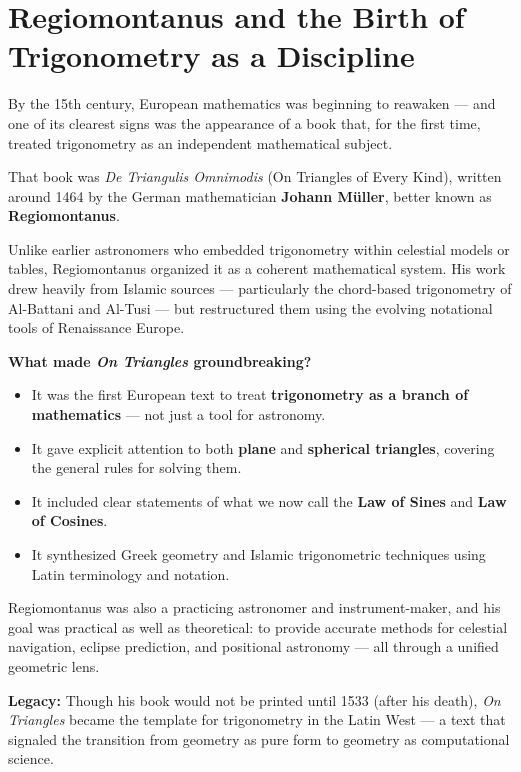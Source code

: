 \section{Regiomontanus and the Birth of Trigonometry as a Discipline}

By the 15th century, European mathematics was beginning to reawaken — and one of its clearest signs was the appearance of a book that, for the first time, treated trigonometry as an independent mathematical subject.

That book was \textit{De Triangulis Omnimodis} (On Triangles of Every Kind), written around 1464 by the German mathematician \textbf{Johann Müller}, better known as \textbf{Regiomontanus}.

\medskip

Unlike earlier astronomers who embedded trigonometry within celestial models or tables, Regiomontanus organized it as a coherent mathematical system. His work drew heavily from Islamic sources — particularly the chord-based trigonometry of Al-Battani and Al-Tusi — but restructured them using the evolving notational tools of Renaissance Europe.

\medskip

\textbf{What made \textit{On Triangles} groundbreaking?}
\begin{itemize}
  \item It was the first European text to treat \textbf{trigonometry as a branch of mathematics} — not just a tool for astronomy.
  \item It gave explicit attention to both \textbf{plane} and \textbf{spherical triangles}, covering the general rules for solving them.
  \item It included clear statements of what we now call the \textbf{Law of Sines} and \textbf{Law of Cosines}.
  \item It synthesized Greek geometry and Islamic trigonometric techniques using Latin terminology and notation.
\end{itemize}

\medskip

Regiomontanus was also a practicing astronomer and instrument-maker, and his goal was practical as well as theoretical: to provide accurate methods for celestial navigation, eclipse prediction, and positional astronomy — all through a unified geometric lens.

\medskip

\textbf{Legacy:} Though his book would not be printed until 1533 (after his death), \textit{On Triangles} became the template for trigonometry in the Latin West — a text that signaled the transition from geometry as pure form to geometry as computational science.


